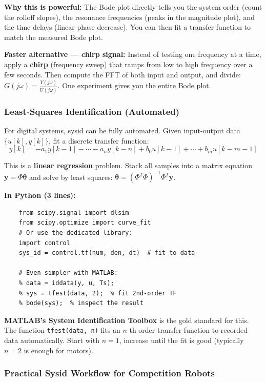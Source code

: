 \textbf{Why this is powerful:} The Bode plot directly tells you the system order (count the rolloff slopes), the resonance frequencies (peaks in the magnitude plot), and the time delays (linear phase decrease). You can then fit a transfer function to match the measured Bode plot.

\textbf{Faster alternative --- chirp signal:} Instead of testing one frequency at a time, apply a \textbf{chirp} (frequency sweep) that ramps from low to high frequency over a few seconds. Then compute the FFT of both input and output, and divide: $G(j\omega) = \frac{Y(j\omega)}{U(j\omega)}$. One experiment gives you the entire Bode plot.

\subsubsection{Least-Squares Identification (Automated)}

For digital systems, sysid can be fully automated. Given input-output data $\{u[k], y[k]\}$, fit a discrete transfer function:
\begin{equation}
y[k] = -a_1 y[k{-}1] - \cdots - a_n y[k{-}n] + b_0 u[k{-}1] + \cdots + b_m u[k{-}m{-}1]
\end{equation}

This is a \textbf{linear regression} problem. Stack all samples into a matrix equation $\mathbf{y} = \Phi \boldsymbol{\theta}$ and solve by least squares: $\boldsymbol{\theta} = (\Phi^T \Phi)^{-1} \Phi^T \mathbf{y}$.

\textbf{In Python (3 lines):}
\begin{verbatim}
    from scipy.signal import dlsim
    from scipy.optimize import curve_fit
    # Or use the dedicated library:
    import control
    sys_id = control.tf(num, den, dt)  # fit to data

    # Even simpler with MATLAB:
    % data = iddata(y, u, Ts);
    % sys = tfest(data, 2);  % fit 2nd-order TF
    % bode(sys);  % inspect the result
\end{verbatim}

\textbf{MATLAB's System Identification Toolbox} is the gold standard for this. The function \texttt{tfest(data, n)} fits an $n$-th order transfer function to recorded data automatically. Start with $n = 1$, increase until the fit is good (typically $n = 2$ is enough for motors).

\subsubsection{Practical Sysid Workflow for Competition Robots}

